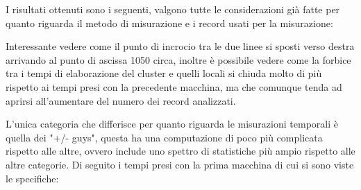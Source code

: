 \documentclass[10.5pt,a4paper,twocolumn]{article}
\begin{document}
I risultati ottenuti sono i seguenti, valgono tutte le considerazioni già fatte per quanto riguarda il metodo di misurazione e i record usati per la misurazione:


Interessante vedere come il punto di incrocio tra le due linee si sposti verso destra arrivando al punto di ascissa 1050 circa, inoltre è possibile vedere come la forbice tra i tempi di elaborazione del cluster e quelli locali si chiuda molto di più rispetto ai tempi presi con la precedente macchina, ma che comunque tenda ad aprirsi all'aumentare del numero dei record analizzati.

L'unica categoria che differisce per quanto riguarda le misurazioni temporali è quella dei "+/- guys", questa ha una computazione di poco più complicata rispetto alle altre, ovvero include uno spettro di statistiche più ampio rispetto alle altre categorie. Di seguito i tempi presi con la prima macchina di cui si sono viste le specifiche:
\end{document}
